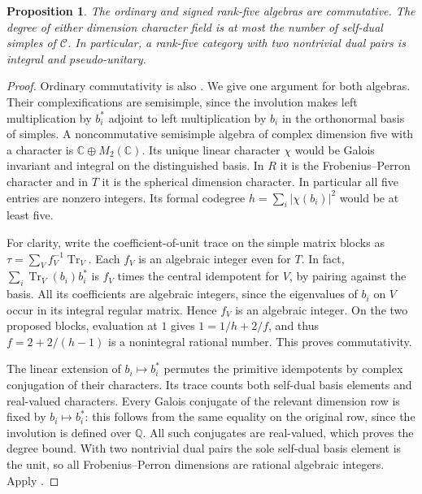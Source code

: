 \documentclass[11pt,a4paper]{article}
\newtheorem{proposition}[theorem]{Proposition}
\numberwithin{equation}{section}
\begin{document}
\begin{proposition}\label{prop:rank-five-commutative}
The ordinary and signed rank-five algebras are commutative.
The degree of either dimension character field is at most the number of
self-dual simples of $\mathcal C$. In particular, a rank-five category with
two nontrivial dual pairs is integral and pseudo-unitary.
\end{proposition}
\begin{proof}
Ordinary commutativity is also \cite[Proposition~9.2]{ABDP}. We give one
argument for both algebras. Their complexifications are semisimple, since
the involution makes left multiplication by $b_i^*$ adjoint to left
multiplication by $b_i$ in the orthonormal basis of simples. A noncommutative
semisimple algebra of complex dimension five with a character is
$\mathbb C\oplus M_2(\mathbb C)$. Its unique linear character $\chi$ would
be Galois invariant and integral on the distinguished basis. In $R$ it is
the Frobenius--Perron character and in $T$ it is the spherical dimension
character. In particular all five entries are nonzero integers. Its formal
codegree $h=\sum_i|\chi(b_i)|^2$ would be at least five.

For clarity, write the coefficient-of-unit trace on the simple matrix
blocks as $\tau=\sum_V f_V^{-1}\operatorname{Tr}_V$. Each $f_V$ is an
algebraic integer even for $T$. In fact,
$\sum_i\operatorname{Tr}_V(b_i)b_i^*$ is $f_V$ times the central idempotent
for $V$, by pairing against the basis. All its coefficients are algebraic
integers, since the eigenvalues of $b_i$ on $V$ occur in its integral regular
matrix. Hence $f_V$ is an algebraic integer. On the two proposed blocks,
evaluation at $1$ gives $1=1/h+2/f$, and thus
$f=2+2/(h-1)$ is a nonintegral rational number. This proves commutativity.

The linear extension of $b_i\mapsto b_i^*$ permutes the primitive
idempotents by complex conjugation of their characters. Its trace counts
both self-dual basis elements and real-valued characters. Every Galois
conjugate of the relevant dimension row is fixed by $b_i\mapsto b_i^*$:
this follows from the same equality on the original row, since the
involution is defined over $\mathbb Q$. All such conjugates are real-valued,
which proves the degree bound. With two nontrivial dual pairs the sole
self-dual basis element is the unit, so all Frobenius--Perron dimensions
are rational algebraic integers. Apply \cite[Propositions~8.23--8.24]{ENO}.
\end{proof}
\end{document}
